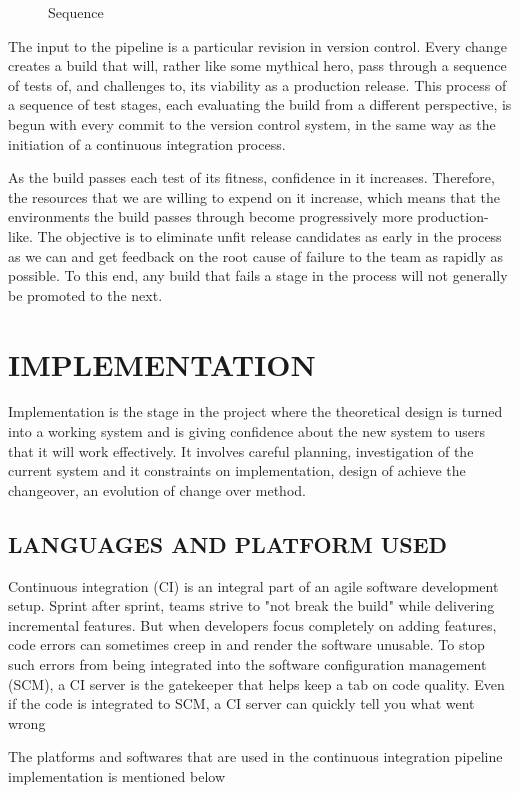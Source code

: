 \documentclass[12pt,a4paper,oneside]{report}
\begin{document}
{\begin{figure}[h]
\begin{center}
\hspace{.0 in}
\caption{Sequence}
\end{center}

\end{figure}
\par
The input to the pipeline is a particular revision in version control. Every change creates a build that will, rather like some mythical hero, pass through a sequence of tests of, and challenges to, its viability as a production release. This process of a sequence of test stages, each evaluating the build from a different perspective, is begun with every commit to the version control system, in the same way as the initiation of a continuous integration process.
\par
As the build passes each test of its fitness, confidence in it increases. Therefore, the resources that we are willing to expend on it increase, which means that the environments the build passes through become progressively more production-like. The objective is to eliminate unfit release candidates as early in the process as we can and get feedback on the root cause of failure to the team as rapidly as possible. To this end, any build that fails a stage in the process will not generally be promoted to the next.
\chapter{IMPLEMENTATION}
Implementation is the stage in the project where the theoretical design is turned into a working system and is giving confidence about the new system to users that it will work effectively. It involves careful planning, investigation of the current system and it constraints on implementation, design of achieve the changeover, an evolution of change over method.

\section{LANGUAGES AND PLATFORM USED}
\par Continuous integration (CI) is an integral part of an agile software development setup. Sprint after sprint, teams strive to "not break the build" while delivering incremental features. But when developers focus completely on adding features, code errors can sometimes creep in and render the software unusable. To stop such errors from being integrated into the software configuration management (SCM), a CI server is the gatekeeper that helps keep a tab on code quality. Even if the code is integrated to SCM, a CI server can quickly tell you what went wrong
\par
	The platforms and softwares that are used in the continuous integration pipeline implementation is mentioned below 
}
\end{document}
